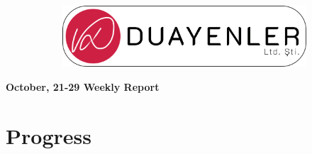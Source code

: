 \documentclass[a4paper,12pt]{article}
\begin{document}
	
\begin{figure}
	\vspace*{-.7cm}
	\centering
	\begin{figure}[H]
		\center
		\setlength{\unitlength}{\textwidth} 
		\includegraphics[width=0.9\unitlength]{../../../Documents/logos/logo3-with-stroke}
	\end{figure}
\end{figure}
\vspace*{-1.7cm}
\begin{center}
	\Large\textbf{October, 21-29 Weekly Report}
	\end{center}



\section{Progress}
\end{document}
